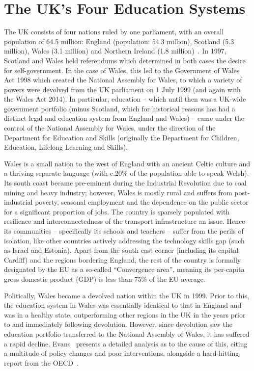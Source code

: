 \documentclass{llncs}
\begin{document}
\section{The UK's Four Education Systems}\label{welshukedu}

The UK consists of four nations ruled by one parliament, with an
overall population of 64.5 million: England (population: 54.3
million), Scotland (5.3 million), Wales (3.1 million) and Northern
Ireland (1.8 million)~\cite{onspop:2016}. In 1997, Scotland and Wales
held referendums which determined in both cases the desire for
self-government.  In the case of Wales, this led to the Government of
Wales Act 1998 which created the National Assembly for Wales, to which
a variety of powers were devolved from the UK parliament on 1 July
1999 (and again with the Wales Act 2014).  In particular, education --
which until then was a UK-wide government portfolio (minus Scotland,
which for historical reasons has had a distinct legal and education
system from England and Wales) -- came under the control of the
National Assembly for Wales, under the direction of the Department for
Education and Skills (originally the Department for Children,
Education, Lifelong Learning and Skills).

Wales is a small nation to the west of England with an ancient Celtic
culture and a thriving separate language (with c.20\% of the population able to
speak Welsh).  Its south coast became pre-eminent during the
Industrial Revolution due to coal mining and heavy industry; however,
Wales is mostly rural and suffers from post-industrial poverty,
seasonal employment and the dependence on the public sector for a
significant proportion of jobs. The country is sparsely populated with
resilience and interconnectedness of the transport infrastructure an
issue.  Hence its communities -- specifically its schools and
teachers -- suffer from the perils of isolation, like other countries
actively addressing the technology skills gap (such as Israel and
Estonia). Apart from the south east corner (including its capital
Cardiff) and the regions bordering England, the rest of the country is
formally designated by the EU as a so-called ``Convergence area'',
meaning its per-capita gross domestic product (GDP) is less than 75\%
of the EU average.

Politically, Wales became a devolved nation within the UK in 1999.
Prior to this, the education system in Wales was essentially
identical to that in England and was in a healthy state, outperforming
other regions in the UK in the years prior to and immediately
following devolution.  However, since devolution saw the education
portfolio transferred to the National Assembly of Wales, it has
suffered a rapid decline. Evans~\cite{Evans:2015} presents a
detailed analysis as to the cause of this, citing a multitude of
policy changes and poor interventions, alongside a hard-hitting report
from the OECD~\cite{oecdwales:2014}.
\end{document}
